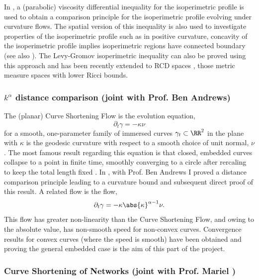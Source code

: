 \documentclass[12pt]{amsart}
\begin{document}
In \cite{Bryan,pbthesis,MR2843240,MR2794630}, a (parabolic) viscosity differential inequality for the isoperimetric profile is used to obtain a comparison principle for the isoperimetric profile evolving under curvature flows. The spatial version of this inequality is also used to investigate properties of the isoperimetric profile such as in positive curvature, concavity of the isoperimetric profile implies isoperimetric regions have connected boundary (see also \cite{MR1674097}). The Levy-Gromov isoperimetric inequality can also be proved using this approach \cite{MR3544942} and has been recently extended to RCD spaces \cite{MR3608721}, those metric measure spaces with lower Ricci bounds.

\subsubsection*{$k^{\alpha}$ distance comparison (joint with Prof. Ben Andrews)}
\label{sec-2-1-3}

The (planar) Curve Shortening Flow is the evolution equation,
\[
\partial_t \gamma = - \kappa\nu
\]
for a smooth, one-parameter family of immersed curves $\gamma_t \subset \RR^2$ in the plane with $\kappa$ is the geodesic curvature with respect to a smooth choice of unit normal, $\nu$. The most famous result regarding this equation is that closed, embedded curves collapse to a point in finite time, smoothly converging to a circle after rercaling to keep the total length fixed \cite{MR840401,MR906392}. In \cite{MR2794630}, with Prof. Ben Andrews I proved a distance comparison principle leading to a curvature bound and subsequent direct proof of this result. A related flow is the flow,
\[
\partial_t \gamma = -\kappa\abs{\kappa}^{\alpha-1} \nu.
\]
This flow has greater non-linearity than the Curve Shortening Flow, and owing to the absolute value, has non-smooth speed for non-convex curves. Convergence results for convex curves (where the speed is smooth) have been obtained \cite{MR1660843} and proving the general embedded case is the aim of this part of the project.

\subsubsection*{Curve Shortening of Networks (joint with Prof. Mariel \saez)}
\label{sec-2-1-4}
\end{document}
